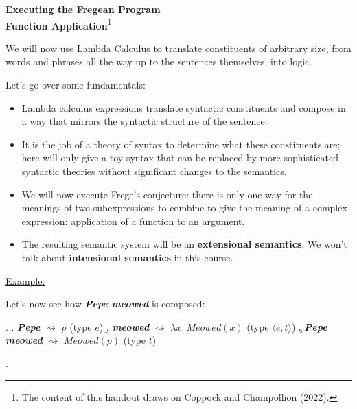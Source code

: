 \documentclass[11pt]{article}
\date{}
\begin{document}
 

\begin{center}
\textbf{\LARGE Executing the Fregean Program\\ Function Application}\footnote{The content of this handout draws on Coppock and Champollion (2022).}
\end{center}

\vspace{20pt} 



We will now use Lambda Calculus to translate constituents of arbitrary size, from words and phrases all the way up to the sentences themselves, into logic.

Let's go over some fundamentals: 

\begin{itemize}
\item Lambda calculus expressions translate syntactic constituents and compose in a way that mirrors the syntactic structure of the sentence.	
\item It is the job of a theory of syntax to determine what these constituents are; here will only give a toy syntax that can be replaced by more sophisticated syntactic theories without significant changes to the semantics.
\item We will now execute Frege's conjecture: there is only one way for the meanings of two subexpressions to combine to give the meaning of a complex expression: application of a function to an argument. 
\item The resulting semantic system will be an \textbf{extensional semantics}. We won't talk about \textbf{intensional semantics} in this course. 
\end{itemize}

\vspace{10pt} 
\underline{Example:}

Let's now see how \textit{\textbf{Pepe meowed}} is composed: 



\ex.  \a. \textit{\textbf{Pepe}} $\rightsquigarrow$ $p$ (type $e$)
\b. \textit{\textbf{meowed}} $\rightsquigarrow$ $\lambda x. \ Meowed(x)$ (type $\langle e,t \rangle$)
\c. \textit{\textbf{Pepe meowed}} $\rightsquigarrow$ $Meowed(p)$ (type $t$)


\ex. \leavevmode\vadjust{\vspace{-\baselineskip}}\newline {}
\end{document}
